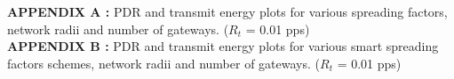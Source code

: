 \singlespacing

\textbf{APPENDIX A :} PDR and transmit energy plots for various spreading factors, network radii and number of gateways. (${R_{t}}$ = 0.01 pps)\\
\textbf{APPENDIX B :} PDR and transmit energy plots for various smart spreading factors schemes, network radii and number of gateways. (${R_{t}}$ = 0.01 pps)\\
